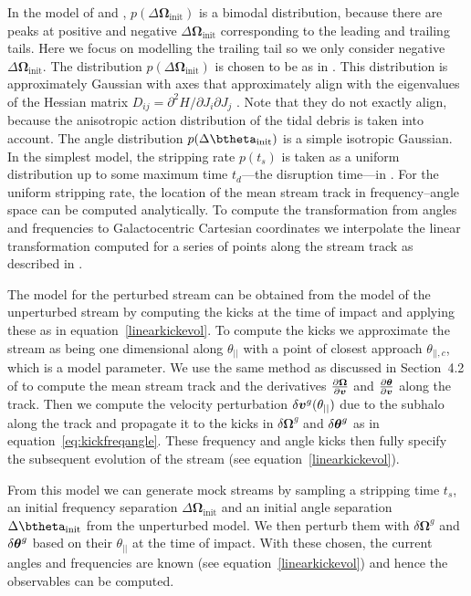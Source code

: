 \documentclass[useAMS,usenatbib,fleqn,a4paper]{mn2e}
\newcommand{\bs}[1]{\bmath{#1}}
\begin{document}
In the model of \cite{Bovy2014} and \cite{Sanders2014}, $p(\Delta\boldsymbol{\Omega}_\mathrm{init})$ is a bimodal distribution, because there are peaks at positive and negative $\Delta\boldsymbol{\Omega}_\mathrm{init}$ corresponding to the leading and trailing tails. Here we focus on modelling the trailing tail so we only consider negative $\Delta\boldsymbol{\Omega}_\mathrm{init}$. The distribution $p(\Delta\boldsymbol{\Omega}_\mathrm{init})$ is chosen to be as in \cite{Bovy2014}. This distribution is approximately Gaussian with axes that approximately align with the eigenvalues of the Hessian matrix $D_{ij}=\partial^2H/\partial J_i\partial J_j$ \citep{BinneyTremaine}. Note that they do not exactly align, because the anisotropic action distribution of the tidal debris is taken into account. The angle distribution $p(\Delta\btheta_\mathrm{init})$ is a simple isotropic Gaussian. In the simplest model, the stripping rate $p(t_s)$ is taken as a uniform distribution up to some maximum time $t_d$---the disruption time---in \cite{Bovy2014}. For the uniform stripping rate, the location of the mean stream track in frequency--angle space can be computed analytically. To compute the transformation from angles and frequencies to Galactocentric Cartesian coordinates we interpolate the linear transformation computed for a series of points along the stream track as described in \cite{Bovy2014}.

The model for the perturbed stream can be obtained from the model of the unperturbed stream by computing the kicks at the time of impact and applying these as in equation~\eqref{linearkickevol}. To compute the kicks we approximate the stream as being one dimensional along $\theta_{||}$ with a point of closest approach $\theta_{||,c}$, which is a model parameter. We use the same method as discussed in Section~4.2 of \cite{Bovy2014} to compute the mean stream track and the derivatives $\frac{\upartial \boldsymbol{\Omega}}{\upartial \bs{v}}$ and $\frac{\upartial \bs{\theta}}{\upartial \bs{v}}$ along the track. Then we compute the velocity perturbation $\delta\bs{v}^g(\theta_{||})$ due to the subhalo along the track and propagate it to the kicks in $\delta \boldsymbol{\Omega}^g$ and $\delta \bs{\theta}^g$ as in equation~\eqref{eq:kickfreqangle}. These frequency and angle kicks then fully specify the subsequent evolution of the stream (see equation~\eqref{linearkickevol}).

From this model we can generate mock streams by sampling a stripping time $t_s$, an initial frequency separation $\Delta\boldsymbol{\Omega}_\mathrm{init}$ and an initial angle separation $\Delta\btheta_\mathrm{init}$ from the unperturbed model. We then perturb them with $\delta \boldsymbol{\Omega}^g$ and $\delta \bs{\theta}^g$ based on their $\theta_{||}$ at the time of impact. With these chosen, the current angles and frequencies are known (see equation~\eqref{linearkickevol}) and hence the observables can be computed.
\end{document}
